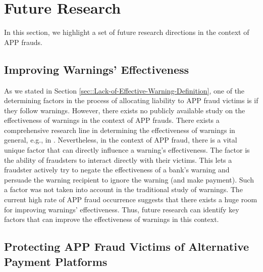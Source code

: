 
\vspace{-1mm}
\section{Future Research}\label{sec::Future-Research}


In this section, we highlight a set of future research directions in the context of APP frauds. 




\subsection{Improving Warnings' Effectiveness}

As we stated in  Section \ref{sec::Lack-of-Effective-Warning-Definition},  one of the determining factors in the process of allocating liability to APP fraud victims is if they follow warnings. However,  there exists no publicly available study on the effectiveness of warnings in  the context of APP frauds. There exists a comprehensive research line in determining the effectiveness of warnings in general, e.g., in \cite{brinton2016users,felt2014experimenting,laughery2006designing}. 
%
%
Nevertheless, in the context of APP fraud, there is a vital unique factor that can directly influence a warning's effectiveness. The factor is the ability of  fraudsters to interact directly with their victims. This lets a fraudster actively try to negate the effectiveness of a bank's warning and persuade the warning recipient to ignore the warning (and make payment). Such a factor was not taken into account in the traditional study of warnings. The current high rate of  APP fraud occurrence suggests that there exists a huge room for improving warnings' effectiveness. Thus, future research can identify key factors that can improve the effectiveness of warnings in this context. 

\vspace{-.5mm}
\subsection{Protecting APP Fraud Victims of Alternative Payment Platforms}

